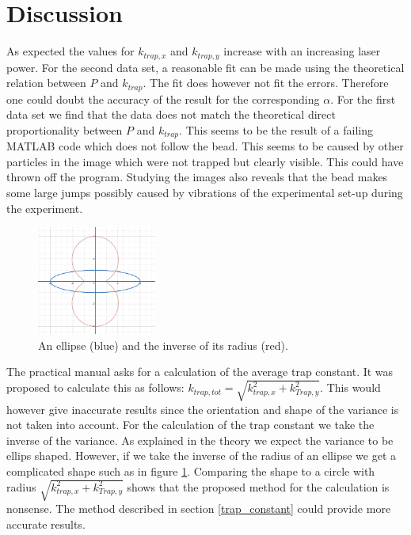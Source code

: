 \section{Discussion}
As expected the values for $k_{trap,x}$ and $k_{trap,y}$ increase with an increasing laser power. For the second data set, a reasonable fit can be made using the theoretical relation between $P$ and $k_{trap}$. The fit does however not fit the errors. Therefore one could doubt the accuracy of the result for the corresponding $\alpha$. For the first data set we find that the data does not match the theoretical direct proportionality between $P$ and $k_{trap}$. This seems to be the result of a failing MATLAB code which does not follow the bead. This seems to be caused by other particles in the image  which were not trapped but clearly visible. This could have thrown off the program. Studying the images also reveals that the bead makes some large jumps possibly caused by vibrations of the experimental set-up during the experiment.  \
\begin{figure}
    \centering
    \includegraphics[width=0.35\textwidth,keepaspectratio]{figures/ellipse_inverse.png}
    \caption{An ellipse (blue) and the inverse of its radius (red).}
    \label{fig_ellipse_inverse}
\end{figure}
The practical manual asks for a calculation of the average trap constant. It was proposed to calculate this as follows: $k_{trap,tot} = \sqrt{k_{trap,x}^2 + k_{Trap,y}^2}$. This would however give inaccurate results since the orientation and shape of the variance is not taken into account. For the calculation of the trap constant we take the inverse of the variance. As explained in the theory we expect the variance to be ellips shaped. However, if we take the inverse of the radius of an ellipse we get a complicated shape such as in figure \ref{fig_ellipse_inverse}. Comparing the shape to a circle with radius $\sqrt{k_{trap,x}^2 + k_{Trap,y}^2}$ shows that the proposed method for the calculation is nonsense. The method described in section \ref{trap_constant} could provide more accurate results. 
